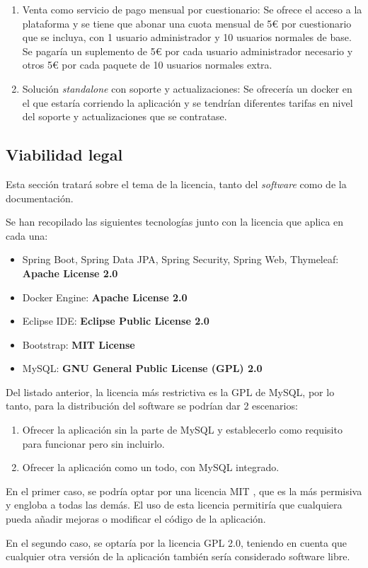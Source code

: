 \begin{enumerate}
	\item Venta como servicio de pago mensual por cuestionario: Se ofrece el acceso a la plataforma y se tiene que abonar una cuota mensual de 5€ por cuestionario que se incluya, con 1 usuario administrador y 10 usuarios normales de base. Se pagaría un suplemento de 5€ por cada usuario administrador necesario y otros 5€ por cada paquete de 10 usuarios normales extra.
	\item Solución \textit{standalone} con soporte y actualizaciones: Se ofrecería un docker en el que estaría corriendo la aplicación y se tendrían diferentes tarifas en nivel del soporte y actualizaciones que se contratase.
\end{enumerate}

\subsection{Viabilidad legal}

Esta sección tratará sobre el tema de la licencia, tanto del \textit{software} como de la documentación.

Se han recopilado las siguientes tecnologías junto con la licencia que aplica en cada una:

\begin{itemize}
	\item Spring Boot, Spring Data JPA, Spring Security, Spring Web, Thymeleaf: \textbf{Apache License 2.0}
	\item Docker Engine: \textbf{Apache License 2.0}
	\item Eclipse IDE:  \textbf{Eclipse Public License 2.0}
	\item Bootstrap:  \textbf{MIT License}
	\item MySQL:  \textbf{GNU General Public License (GPL) 2.0}
\end{itemize}

Del listado anterior, la licencia más restrictiva es la GPL de MySQL, por lo tanto, para la distribución del software se podrían dar 2 escenarios:

\begin{enumerate}
	\item Ofrecer la aplicación sin la parte de MySQL y establecerlo como requisito para funcionar pero sin incluirlo.
	\item Ofrecer la aplicación como un todo, con MySQL integrado.
\end{enumerate}

En el primer caso, se podría optar por una licencia MIT , que es la más permisiva y engloba a todas las demás. 
El uso de esta licencia permitiría que cualquiera pueda añadir mejoras o modificar el código de la aplicación.

En el segundo caso, se optaría por la licencia GPL 2.0, teniendo en cuenta que cualquier otra versión de la aplicación también sería considerado software libre.

